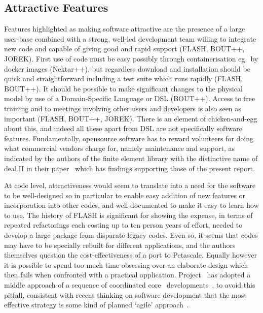 \subsection{Attractive Features}\label{sec:attract}
Features highlighted as making software attractive are the presence of a 
large user-base combined with a strong, well-led development team willing to 
integrate new code and capable of giving good and rapid support (FLASH, BOUT++, JOREK).
First use of code must be easy possibly through containerisation eg.\ by docker images
(Nektar++), but regardless download and installation should be quick and straightforward
including a test suite which runs rapidly (FLASH, BOUT++).
It should be possible to make significant changes to the physical model by use of a
Domain-Specific Language or DSL (BOUT++).
Access to free training and to meetings involving other users and developers is also seen as
important (FLASH, BOUT++, JOREK).  There is an element of chicken-and-egg about this,
and indeed all these apart from DSL
are not specifically software features.  Fundamentally, opensource software has
to reward volunteers for doing what commercial vendors charge for, namely maintenance
and support, as indicated by the authors of the finite element library with the
distinctive name of deal.II in
their paper~\cite{Ba13What} which has findings supporting those of the present report.

At code level, attractiveness would seem to translate into a need
for the software to be well-designed so in particular to enable easy addition of
new features or incorporation into other codes, and well-documented to make it
easy to learn how to use.
The history of FLASH is significant for showing the expense, in terms of repeated refactorings
each costing up to ten person years of effort,
needed to develop a large package from disparate legacy codes.
Even so, it seems that codes may have to be specially rebuilt for different applications,
and the authors themselves question the cost-effectiveness of a port to Petascale.
Equally however it is possible to spend too much time obsessing over an
elaborate design
which then fails when confronted with a practical application. 
Project \nep\  has adopted a middle approach of a sequence of coordinated
core \papp\ developments~\cite{sciplan}, to avoid this pitfall,
consistent with recent thinking on software development that the most
effective strategy is some kind of planned `agile' approach~\cite{hewitt,sommerville}.

